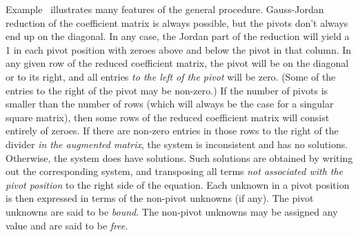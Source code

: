 Example \en\ illustrates many features of the general procedure.
Gauss-Jordan reduction of the coefficient matrix is always
possible, but the pivots don't always end up on the diagonal.
In any case, the Jordan part of the reduction will yield
a 1 in each pivot position with zeroes above and below the
pivot in that column.   In any given row of the reduced
coefficient matrix, the pivot will be
on the diagonal or to its right, and  all entries {\it to the left
of the pivot\/} will be zero.  (Some of the entries to the right
of the pivot may be non-zero.)   
If the number of pivots is smaller than the number of rows
(which will always be the case for a singular square matrix),
then some rows of the reduced coefficient matrix will
 consist entirely of zeroes.
If there are non-zero entries in those rows 
to the right of the
divider {\it in the augmented matrix\/}, the system is inconsistent and
has no solutions.  Otherwise, the system does have solutions.
Such solutions are obtained by writing out the corresponding
system, and transposing all terms {\it not associated with the
pivot position\/} to the right side of the equation.  Each
unknown in a pivot position is then expressed in terms of
the non-pivot unknowns (if any). The pivot unknowns
are said to be {\it bound}.  The non-pivot unknowns may
be assigned any value and are said to be {\it free}.



